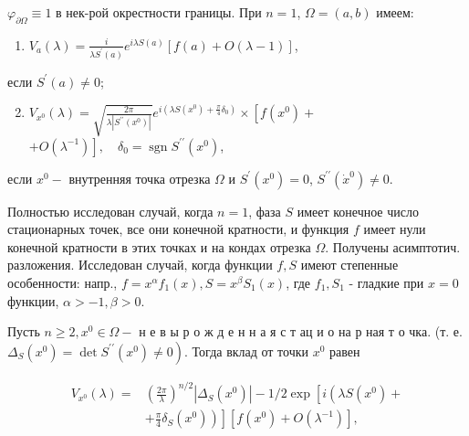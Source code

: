 \documentclass[10pt]{article}
\begin{document}
$\varphi_{\partial \Omega} \equiv 1$ в нек-рой окрестности границы. При $n=1$, $\Omega=(a, b)$ имеем:



\begin{enumerate}

  \item $V_{a}(\lambda)=\frac{i}{\lambda S^{\prime}(a)} e^{i \lambda S(a)}[f(a)+O(\lambda-1)]$,

\end{enumerate}



если $S^{\prime}(a) \neq 0$;



\begin{enumerate}

  \setcounter{enumi}{1}

  \item $V_{x^{0}}(\lambda)=\sqrt{\frac{2 \pi}{\lambda\left|S^{\prime \prime}\left(x^{0}\right)\right|}} e^{i\left(\lambda S\left(x^{0}\right)+\frac{\pi}{4} \delta_{0}\right)} \times\left[f\left(x^{0}\right)+\right.$ $\left.+O\left(\lambda^{-1}\right)\right], \quad \delta_{0}=\operatorname{sgn} S^{\prime \prime}\left(x^{0}\right)$,

\end{enumerate}



если $x^{0}-$ внутренняя точка отрезка $\Omega$ и $S^{\prime}\left(x^{0}\right)=0$, $S^{\prime \prime}\left(\dot{x}^{0}\right) \neq 0$.



Полностью исследован случай, когда $n=1$, фаза $S$ имеет конечное число стационарных точек, все они конечной кратности, и функция $f$ имеет нули конечной кратности в этих точках и на кондах отрезка $\Omega$. Получены асимптотич. разложения. Исследован случай, когда функции $f, S$ имеют степенные особенности: напр., $f=x^{\alpha} f_{1}(x), S=x^{\beta} S_{1}(x)$, где $f_{1}, S_{1}$ - гладкие при $x=0$ функции, $\alpha>-1, \beta>0$.



Пусть $n \geqslant 2, x^{0} \in \Omega-$ н е в ы р о ж д е н н а я с т ац и о на р ная т о чка. (т. е. $\left.\Delta_{S}\left(x^{0}\right)=\operatorname{det} S^{\prime \prime}\left(x^{0}\right) \neq 0\right)$. Тогда вклад от точки $x^{0}$ равен



\[

\begin{aligned}

V_{x^{0}}(\lambda)= & \left(\frac{2 \pi}{\lambda}\right)^{n / 2}\left|\Delta_{S}\left(x^{0}\right)\right|-1 / 2 \exp \left[i \left(\lambda S\left(x^{0}\right)+\right.\right. \\

& \left.\left.+\frac{\pi}{4} \delta_{S}\left(x^{0}\right)\right)\right]\left[f\left(x^{0}\right)+O\left(\lambda^{-1}\right)\right],

\end{aligned}

\]
\end{document}
